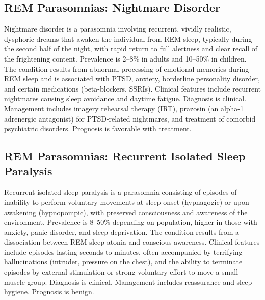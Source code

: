 \subsection{REM Parasomnias: Nightmare Disorder}
\label{sec:Nightmare Disorder}
Nightmare disorder is a parasomnia involving recurrent, vividly realistic, dysphoric dreams that awaken the individual from REM sleep, typically during the second half of the night, with rapid return to full alertness and clear recall of the frightening content. Prevalence is 2--8\% in adults and 10--50\% in children. The condition results from abnormal processing of emotional memories during REM sleep and is associated with PTSD, anxiety, borderline personality disorder, and certain medications (beta-blockers, SSRIs). Clinical features include recurrent nightmares causing sleep avoidance and daytime fatigue. Diagnosis is clinical. Management includes imagery rehearsal therapy (IRT), prazosin (an alpha-1 adrenergic antagonist) for PTSD-related nightmares, and treatment of comorbid psychiatric disorders. Prognosis is favorable with treatment.

\subsection{REM Parasomnias: Recurrent Isolated Sleep Paralysis}
\label{sec:Recurrent Isolated Sleep Paralysis}
Recurrent isolated sleep paralysis is a parasomnia consisting of episodes of inability to perform voluntary movements at sleep onset (hypnagogic) or upon awakening (hypnopompic), with preserved consciousness and awareness of the environment. Prevalence is 8--50\% depending on population, higher in those with anxiety, panic disorder, and sleep deprivation. The condition results from a dissociation between REM sleep atonia and conscious awareness. Clinical features include episodes lasting seconds to minutes, often accompanied by terrifying hallucinations (intruder, pressure on the chest), and the ability to terminate episodes by external stimulation or strong voluntary effort to move a small muscle group. Diagnosis is clinical. Management includes reassurance and sleep hygiene. Prognosis is benign.


